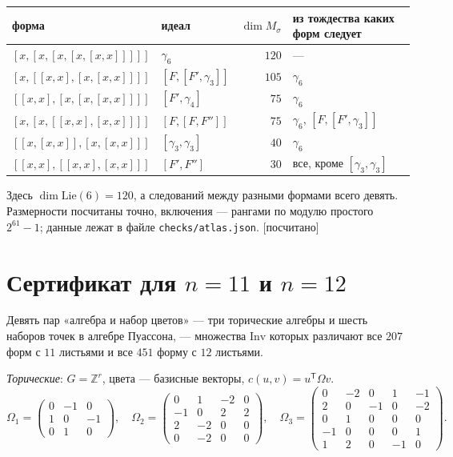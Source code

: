 \documentclass[11pt]{article}
\newcommand{\Lie}{\mathrm{Lie}}
\newcommand{\Inv}{\mathrm{Inv}}
\newcommand{\Z}{\mathbb Z}
\newcommand{\g}{\gamma}
\newcommand{\stat}[1]{\textsf{\small[#1]}}
\newcommand{\computed}{\stat{посчитано}}
\theoremstyle{plain}
\theoremstyle{definition}
\theoremstyle{remark}
\begin{document}
\begin{center}
\begin{tabular}{@{}llrl@{}}
\toprule
форма & идеал & $\dim M_\sigma$ & из тождества каких форм следует \\
\midrule
$[x,[x,[x,[x,[x,x]]]]]$ & $\g_6$ & $120$ & --- \\
$[x,[[x,x],[x,[x,x]]]]$ & $[F,[F',\g_3]]$ & $105$ & $\g_6$ \\
$[[x,x],[x,[x,[x,x]]]]$ & $[F',\g_4]$ & $75$ & $\g_6$ \\
$[x,[x,[[x,x],[x,x]]]]$ & $[F,[F,F'']]$ & $75$ & $\g_6$, $[F,[F',\g_3]]$ \\
$[[x,[x,x]],[x,[x,x]]]$ & $[\g_3,\g_3]$ & $40$ & $\g_6$ \\
$[[x,x],[[x,x],[x,x]]]$ & $[F',F'']$ & $30$ & все, кроме $[\g_3,\g_3]$ \\
\bottomrule
\end{tabular}
\end{center}
Здесь $\dim\Lie(6)=120$, а следований между разными формами всего девять. Размерности посчитаны точно, включения --- рангами по модулю простого $2^{61}-1$; данные лежат в файле \texttt{checks/atlas.json}. \computed

\section{Сертификат для $n=11$ и $n=12$}\label{app:cert}

Девять пар «алгебра и набор цветов» --- три торические алгебры и шесть наборов точек в алгебре Пуассона, --- множества $\Inv$ которых различают все $207$ форм с $11$ листьями и все $451$ форму с $12$ листьями.

\emph{Торические}: $G=\Z^r$, цвета --- базисные векторы, $c(u,v)=u^{\mathsf T}\Omega v$.
\[
\Omega_1=\begin{pmatrix}0&-1&0\\1&0&-1\\0&1&0\end{pmatrix},\quad
\Omega_2=\begin{pmatrix}0&1&-2&0\\-1&0&2&2\\2&-2&0&0\\0&-2&0&0\end{pmatrix},\quad
\Omega_3=\begin{pmatrix}0&-2&0&1&-1\\2&0&-1&0&-2\\0&1&0&0&0\\-1&0&0&0&1\\1&2&0&-1&0\end{pmatrix}.
\]
\end{document}
